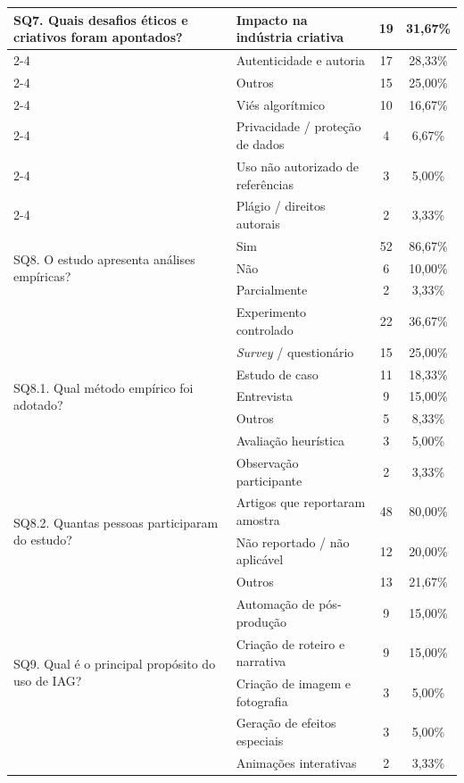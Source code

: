 \begin{longtable}{|p{4.2cm}|p{5.2cm}|c|c|}
\multirow{7}{=}{SQ7. Quais desafios éticos e criativos foram apontados?}
& Impacto na indústria criativa & 19 & 31,67\% \\ \cline{2-4}
& Autenticidade e autoria & 17 & 28,33\% \\ \cline{2-4}
& Outros & 15 & 25,00\% \\ \cline{2-4}
& Viés algorítmico & 10 & 16,67\% \\ \cline{2-4}
& Privacidade / proteção de dados & 4 & 6,67\% \\ \cline{2-4}
& Uso não autorizado de referências & 3 & 5,00\% \\ \cline{2-4}
& Plágio / direitos autorais & 2 & 3,33\% \\
\hline

\multirow{3}{=}{SQ8. O estudo apresenta análises empíricas?}
& Sim & 52 & 86,67\% \\ \cline{2-4}
& Não & 6 & 10,00\% \\ \cline{2-4}
& Parcialmente & 2 & 3,33\% \\
\hline

\multirow{7}{=}{SQ8.1. Qual método empírico foi adotado?}
& Experimento controlado & 22 & 36,67\% \\ \cline{2-4}
& \textit{Survey} / questionário & 15 & 25,00\% \\ \cline{2-4}
& Estudo de caso & 11 & 18,33\% \\ \cline{2-4}
& Entrevista & 9 & 15,00\% \\ \cline{2-4}
& Outros & 5 & 8,33\% \\ \cline{2-4}
& Avaliação heurística & 3 & 5,00\% \\ \cline{2-4}
& Observação participante & 2 & 3,33\% \\
\hline

\multirow{2}{=}{SQ8.2. Quantas pessoas participaram do estudo?}
& Artigos que reportaram amostra & 48 & 80,00\% \\ \cline{2-4}
& Não reportado / não aplicável & 12 & 20,00\% \\
\hline

\multirow{6}{=}{SQ9. Qual é o principal propósito do uso de IAG?}
& Outros & 13 & 21,67\% \\ \cline{2-4}
& Automação de pós-produção & 9 & 15,00\% \\ \cline{2-4}
& Criação de roteiro e narrativa & 9 & 15,00\% \\ \cline{2-4}
& Criação de imagem e fotografia & 3 & 5,00\% \\ \cline{2-4}
& Geração de efeitos especiais & 3 & 5,00\% \\ \cline{2-4}
& Animações interativas & 2 & 3,33\% \\
\hline


\end{longtable}
